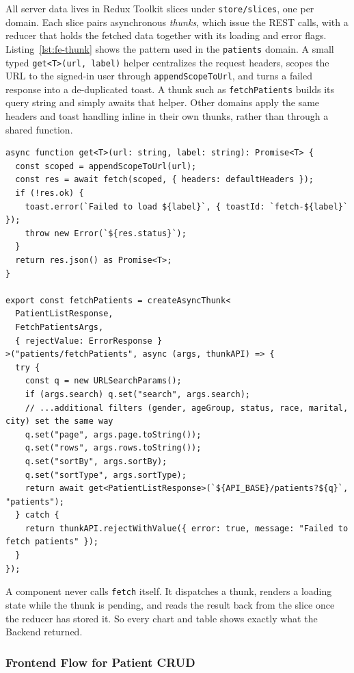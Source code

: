 All server data lives in Redux Toolkit slices under \texttt{store/slices}, one per domain. Each slice pairs asynchronous \emph{thunks}, which issue the REST calls, with a reducer that holds the fetched data together with its loading and error flags. Listing~\ref{lst:fe-thunk} shows the pattern used in the \texttt{patients} domain. A small typed \texttt{get<T>(url, label)} helper centralizes the request headers, scopes the URL to the signed-in user through \texttt{appendScopeToUrl}, and turns a failed response into a de-duplicated toast. A thunk such as \texttt{fetchPatients} builds its query string and simply awaits that helper. Other domains apply the same headers and toast handling inline in their own thunks, rather than through a shared function.

\begin{lstlisting}[style=tsxstyle, caption={Generic fetch helper and a domain thunk built on top of it}, label={lst:fe-thunk}]
async function get<T>(url: string, label: string): Promise<T> {
  const scoped = appendScopeToUrl(url);
  const res = await fetch(scoped, { headers: defaultHeaders });
  if (!res.ok) {
    toast.error(`Failed to load ${label}`, { toastId: `fetch-${label}` });
    throw new Error(`${res.status}`);
  }
  return res.json() as Promise<T>;
}

export const fetchPatients = createAsyncThunk<
  PatientListResponse,
  FetchPatientsArgs,
  { rejectValue: ErrorResponse }
>("patients/fetchPatients", async (args, thunkAPI) => {
  try {
    const q = new URLSearchParams();
    if (args.search) q.set("search", args.search);
    // ...additional filters (gender, ageGroup, status, race, marital, city) set the same way
    q.set("page", args.page.toString());
    q.set("rows", args.rows.toString());
    q.set("sortBy", args.sortBy);
    q.set("sortType", args.sortType);
    return await get<PatientListResponse>(`${API_BASE}/patients?${q}`, "patients");
  } catch {
    return thunkAPI.rejectWithValue({ error: true, message: "Failed to fetch patients" });
  }
});
\end{lstlisting}

A component never calls \texttt{fetch} itself. It dispatches a thunk, renders a loading state while the thunk is pending, and reads the result back from the slice once the reducer has stored it. So every chart and table shows exactly what the Backend returned.

\subsubsection*{Frontend Flow for Patient CRUD}

